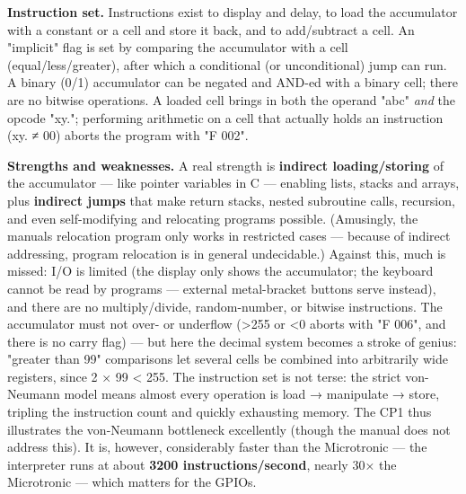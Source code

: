 \documentclass[
  11pt,
  letterpaper,
]{article}
\begin{document}
\textbf{Instruction set.} Instructions exist to display and delay, to
load the accumulator with a constant or a cell and store it back, and to
add/subtract a cell. An "implicit" flag is set by comparing the
accumulator with a cell (equal/less/greater), after which a conditional
(or unconditional) jump can run. A binary (0/1) accumulator can be
negated and AND-ed with a binary cell; there are no bitwise operations.
A loaded cell brings in both the operand "abc" \emph{and} the opcode
"xy."; performing arithmetic on a cell that actually holds an
instruction (xy. ≠ 00) aborts the program with "F 002".

\textbf{Strengths and weaknesses.} A real strength is \textbf{indirect
loading/storing} of the accumulator --- like pointer variables in C ---
enabling lists, stacks and arrays, plus \textbf{indirect jumps} that
make return stacks, nested subroutine calls, recursion, and even
self-modifying and relocating programs possible. (Amusingly, the
manual\textquotesingle s relocation program only works in restricted
cases --- because of indirect addressing, program relocation is in
general undecidable.) Against this, much is missed: I/O is limited (the
display only shows the accumulator; the keyboard cannot be read by
programs --- external metal-bracket buttons serve instead), and there
are no multiply/divide, random-number, or bitwise instructions. The
accumulator must not over- or underflow (\textgreater255 or \textless0
aborts with "F 006", and there is no carry flag) --- but here the
decimal system becomes a stroke of genius: "greater than 99" comparisons
let several cells be combined into arbitrarily wide registers, since 2 ×
99 \textless{} 255. The instruction set is not terse: the strict
von-Neumann model means almost every operation is load → manipulate →
store, tripling the instruction count and quickly exhausting memory. The
CP1 thus illustrates the von-Neumann bottleneck excellently (though the
manual does not address this). It is, however, considerably faster than
the Microtronic --- the interpreter runs at about \textbf{3200
instructions/second}, nearly 30× the Microtronic --- which matters for
the GPIOs.
\end{document}

